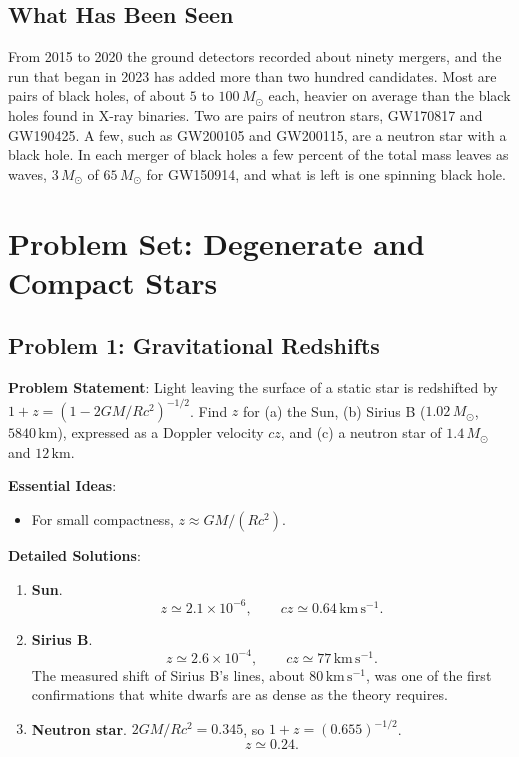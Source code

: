 \subsection{What Has Been Seen}

From 2015 to 2020 the ground detectors recorded about ninety mergers, and the run that began in 2023 has added more than two hundred candidates. Most are pairs of black holes, of about $5$ to $100\,M_\odot$ each, heavier on average than the black holes found in X-ray binaries. Two are pairs of neutron stars, GW170817 and GW190425. A few, such as GW200105 and GW200115, are a neutron star with a black hole. In each merger of black holes a few percent of the total mass leaves as waves, $3\,M_\odot$ of $65\,M_\odot$ for GW150914, and what is left is one spinning black hole.

\section{Problem Set: Degenerate and Compact Stars}

\subsection{Problem 1: Gravitational Redshifts}
\label{cs:prob:redshift}

\textbf{Problem Statement}: Light leaving the surface of a static star is redshifted by $1+z=(1-2GM/Rc^2)^{-1/2}$. Find $z$ for (a) the Sun, (b) Sirius B ($1.02\,M_\odot$, $5840\,\mathrm{km}$), expressed as a Doppler velocity $cz$, and (c) a neutron star of $1.4\,M_\odot$ and $12\,\mathrm{km}$.

\textbf{Essential Ideas}:
\begin{itemize}
	\item For small compactness, $z\approx GM/(Rc^2)$.
\end{itemize}

\textbf{Detailed Solutions}:
\begin{enumerate}[label=(\alph*)]
	\item \textbf{Sun}.
	\[
	\boxed{z\simeq2.1\times10^{-6},\qquad cz\simeq0.64\,\mathrm{km\,s^{-1}}.}
	\]
	\item \textbf{Sirius B}.
	\[
	\boxed{z\simeq2.6\times10^{-4},\qquad cz\simeq77\,\mathrm{km\,s^{-1}}.}
	\]
	The measured shift of Sirius B's lines, about $80\,\mathrm{km\,s^{-1}}$, was one of the first confirmations that white dwarfs are as dense as the theory requires.
	\item \textbf{Neutron star}. $2GM/Rc^2=0.345$, so $1+z=(0.655)^{-1/2}$.
	\[
	\boxed{z\simeq0.24.}
	\]
\end{enumerate}

